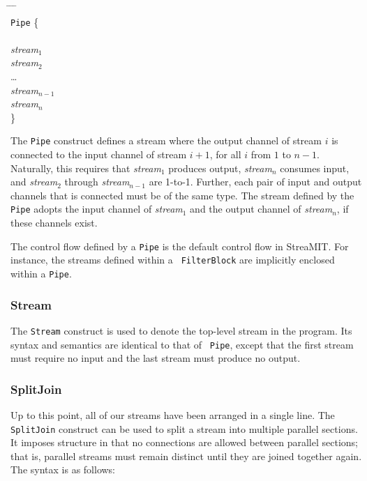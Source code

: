 \begin{tabbing}
\hspace{0.2in} \= \hspace{0.2in} \= \hspace{0.2in} \= \hspace{0.2in} \= \\

{\tt Pipe} \{ \\ \\
\> {\it stream$_1$} \\
\> {\it stream$_2$} \\
\> \dots \\
\> {\it stream$_{n-1}$} \\
\> {\it stream$_n$} \\

\}
\end{tabbing}

The {\tt Pipe} construct defines a stream where the output channel of
stream $i$ is connected to the input channel of stream $i+1$, for all
$i$ from $1$ to $n-1$.  Naturally, this requires that {\it stream$_1$}
produces output, {\it stream$_n$} consumes input, and {\it stream$_2$}
through {\it stream$_{n-1}$} are 1-to-1.  Further, each pair of input
and output channels that is connected must be of the same type.  The
stream defined by the {\tt Pipe} adopts the input channel of {\it
stream$_1$} and the output channel of {\it stream$_n$}, if these
channels exist.

The control flow defined by a {\tt Pipe} is the default control flow
in StreaMIT.  For instance, the streams defined within a {\tt
FilterBlock} are implicitly enclosed within a {\tt Pipe}.  

\subsubsection{Stream}

The {\tt Stream} construct is used to denote the top-level stream in
the program.  Its syntax and semantics are identical to that of {\tt
Pipe}, except that the first stream must require no input and the last
stream must produce no output.

\subsubsection{SplitJoin}

Up to this point, all of our streams have been arranged in a single
line.  The {\tt SplitJoin} construct can be used to split a stream
into multiple parallel sections.  It imposes structure in that no
connections are allowed between parallel sections; that is, parallel
streams must remain distinct until they are joined together again.
The syntax is as follows:

